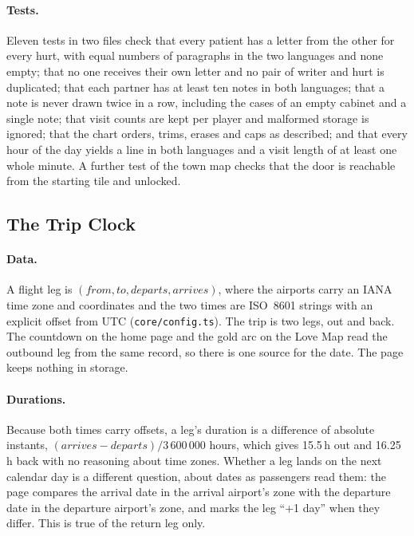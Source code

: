 \documentclass[sigconf,nonacm]{acmart}
\newcommand{\code}[1]{\textnormal{\texttt{\small #1}}}
\begin{document}
\paragraph{Tests.}
Eleven tests in two files check that every patient has a letter from the other for every
hurt, with equal numbers of paragraphs in the two languages and none empty; that no one
receives their own letter and no pair of writer and hurt is duplicated; that each partner has
at least ten notes in both languages; that a note is never drawn twice in a row, including the
cases of an empty cabinet and a single note; that visit counts are kept per player and
malformed storage is ignored; that the chart orders, trims, erases and caps as described; and
that every hour of the day yields a line in both languages and a visit length of at least one
whole minute. A further test of the town map checks that the door is reachable from the
starting tile and unlocked.

\subsection{The Trip Clock}\label{sec:tripclock}
\paragraph{Data.}
A flight leg is $(\mathit{from},\mathit{to},\mathit{departs},\mathit{arrives})$, where the
airports carry an IANA time zone and coordinates and the two times are ISO~8601 strings with an
explicit offset from UTC (\code{core/config.ts}). The trip is two legs, out and back. The
countdown on the home page and the gold arc on the Love Map read the outbound leg from the
same record, so there is one source for the date. The page keeps nothing in storage.

\paragraph{Durations.}
Because both times carry offsets, a leg's duration is a difference of absolute instants,
$(\mathit{arrives}-\mathit{departs})/3\,600\,000$ hours, which gives 15.5\,h out and 16.25\,h
back with no reasoning about time zones. Whether a leg lands on the next calendar day is a
different question, about dates as passengers read them: the page compares the arrival date in
the arrival airport's zone with the departure date in the departure airport's zone, and marks
the leg ``+1 day'' when they differ. This is true of the return leg only.
\end{document}
